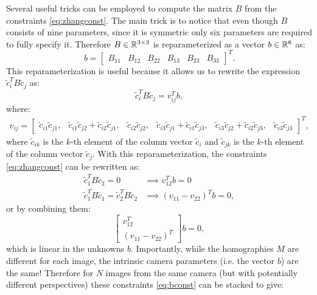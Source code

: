 Several useful tricks can be employed to compute the matrix $B$ from the constraints \eqref{eq:zhangconst}. The main trick is to notice that even though $B$ consists of nine parameters, since it is symmetric only six parameters are required to fully specify it. Therefore $B \in \mathbb{R}^{3\times 3}$ is reparameterized as a vector $b \in \mathbb{R}^6$ as:
\begin{equation}
    b = \begin{bmatrix}
        B_{11} & B_{12} & B_{22} & B_{13} & B_{23} & B_{33}
    \end{bmatrix}^T.
\end{equation}
This reparameterization is useful because it allows us to rewrite the expression $\tilde{c}_i^TB\tilde{c}_j$ as:
\begin{equation}
    \tilde{c}_i^TB\tilde{c}_j = v_{ij}^T b,
\end{equation}
where:
\begin{equation*}
\begin{split}
   v_{ij} = \begin{bmatrix}
        \tilde{c}_{i1}\tilde{c}_{j1}, & \tilde{c}_{i1}\tilde{c}_{j2}+\tilde{c}_{i2}\tilde{c}_{j1}, & \tilde{c}_{i2}\tilde{c}_{j2}, & \tilde{c}_{i3}\tilde{c}_{j1} + \tilde{c}_{i1}\tilde{c}_{j3}, & \tilde{c}_{i3}\tilde{c}_{j2} + \tilde{c}_{i2}\tilde{c}_{j3}, & \tilde{c}_{i3}\tilde{c}_{j3}
    \end{bmatrix}^T,
\end{split}
\end{equation*}
where $\tilde{c}_{ik}$ is the $k$-th element of the column vector $\tilde{c}_i$ and $\tilde{c}_{jk}$ is the $k$-th element of the column vector $\tilde{c}_j$. With this reparameterization, the constraints \eqref{eq:zhangconst} can be rewritten as:
\begin{equation*}
\begin{split}
\tilde{c}_1^T B \tilde{c}_2 = 0 &\implies v_{12}^Tb = 0 \\
\tilde{c}_1^T B \tilde{c}_1 = \tilde{c}_2^T B \tilde{c}_2 &\implies (v_{11} - v_{22})^T b = 0,
\end{split}
\end{equation*}
or by combining them:
\begin{equation} \label{eq:bconst}
    \begin{bmatrix}
        v_{12}^T \\ (v_{11} - v_{22})^T
    \end{bmatrix}b = 0,
\end{equation}
which is linear in the unknowns $b$. Importantly, while the homographies $M$ are different for each image, the intrinsic camera parameters (i.e. the vector $b$) are the same! Therefore for $N$ images from the same camera (but with potentially different perspectives) these constraints \eqref{eq:bconst} can be stacked to give:
